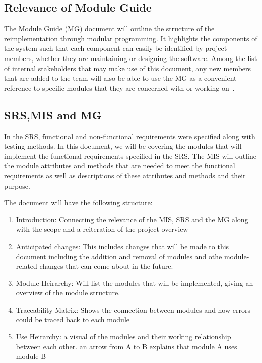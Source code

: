 \documentclass[12pt, titlepage]{article}
\begin{document}
\subsection{Relevance of Module Guide}
The Module Guide (MG) document will outline the structure of the reimplementation through modular programming. It highlights the components of the system such that each component can easily be identified by project members, whether they are maintaining or designing the software. Among the list of internal stakeholders that may make use of this document, any new members that are added to the team will also be able to use the MG as a convenient reference to specific modules that they are concerned with or working on~\citep{ParnasEtAl1984}. 

\subsection{SRS,MIS and MG}
In the SRS, functional and non-functional requirements were specified along with testing methods. In this document, we will be covering the modules that will implement the functional requirements specified in the SRS. The MIS will outline the module attributes and methods that are needed to meet the functional requirements as well as descriptions of these attributes and methods and their purpose.

The document will have the following structure:
\begin{enumerate}
\item Introduction: Connecting the relevance of the MIS, SRS and the MG along with the scope and a reiteration of the project overview
\item Anticipated changes: This includes changes that will be made to this document including the addition and removal of modules and othe module-related
changes that can come about in the future.
\item Module Heirarchy: Will list the modules that will be implemented, giving an overview of the module structure.
\item Traceability Matrix: Shows the connection between modules and how errors could be traced back to each module
\item Use Heirarchy: a visual of the modules and their working relationship between each other. an arrow from A to B explains that 
module A uses module B
\end{enumerate}
\end{document}
